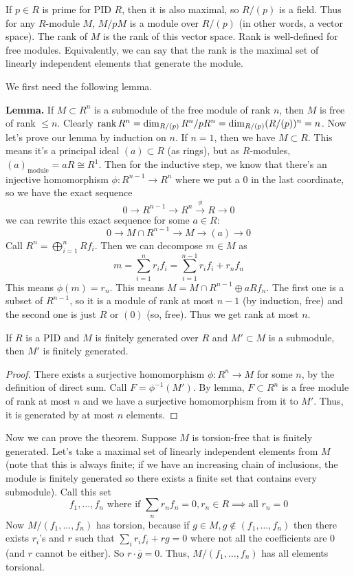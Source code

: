\begin{definition}
    If $p \in R$ is prime for PID $R$, then it is also maximal, so $R/(p)$ is a field.
    Thus for any $R$-module $M$, $M/pM$ is a module over $R/(p)$ (in other words,
    a vector space). The rank of $M$ is the rank of this vector space. Rank is well-defined for free modules. Equivalently,
    we can say that the rank is the maximal set of linearly independent elements that generate the module.
\end{definition}

We first need the following lemma.

\textbf{Lemma.}
    If $M \subset R^n$ is a submodule of the free module of rank $n$, then $M$ is free of rank $\leq n$.
Clearly $\rank R^n = \dim_{R/(p)} R^n/pR^n = \dim_{R/(p)} (R/(p))^n = n$. Now let's prove our lemma by induction on $n$.
If $n = 1$, then we have $M \subset R$. This means it's a principal ideal $(a) \subset R$ (as rings), but as $R$-modules,
$(a)_{\text{module}} = aR \cong R^1$. Then for the inductive step, we know
that there's an injective homomorphism $\phi: R^{n - 1} \to R^n$
where we put a $0$ in the last coordinate,
so we have the exact sequence
\[ 0 \to R^{n - 1} \to R^n \xrightarrow{\phi} R \to 0 \]
we can rewrite this exact sequence for some $a \in R$:
\[ 0 \to M \cap R^{n - 1} \to M \to (a) \to 0 \]
Call $R^n = \bigoplus_{i = 1}^n R f_i$. Then we can decompose $m \in M$ as
\[ m = \sum_{i = 1}^n r_i f_i = \sum_{i = 1}^{n - 1} r_i f_i + r_n f_n \]
This means $\phi(m) = r_n$. This means $M = M \cap R^{n - 1} \oplus a R f_n$. The first one is a subset of $R^{n - 1}$,
so it is a module of rank at most $n - 1$ (by induction, free) and the second one is just $R$ or $(0)$ (so, free). Thus we get rank at most $n$.
\begin{theorem}
    If $R$ is a PID and $M$ is finitely generated over $R$ and $M' \subset M$
    is a submodule, then $M'$ is finitely generated.
    \begin{proof}
        There exists a surjective homomorphism $\phi: R^n \to M$ for some $n$, by the definition of direct sum.
        Call $F = \phi^{-1}(M')$. By lemma, $F \subset R^n$ is a free module of rank at most $n$
        and we have a surjective homomorphism from it to $M'$. Thus,
        it is generated by at most $n$ elements.
    \end{proof}
\end{theorem}
Now we can prove the theorem. Suppose $M$ is torsion-free that is finitely generated. Let's take a maximal set of linearly independent elements from $M$
(note that this is always finite; if we have an increasing chain of inclusions, the module is finitely generated
so there exists a finite set that contains every submodule). Call this set
\[ f_1, \dots, f_n \text{ where if }  \sum_n r_n f_n = 0, r_n \in R \implies \text{all } r_n = 0 \]
Now $M/(f_1, \dots, f_n)$ has torsion, because if $g \in M, g \notin (f_1, \dots, f_n)$ then there exists $r_i$'s and $r$ such that
$\sum_i r_i f_i + rg = 0$ where not all the coefficients are $0$ (and $r$ cannot be either). So $r \cdot \overline{g} = 0$. Thus, $M/(f_1, \dots, f_n)$
has all elements torsional.

